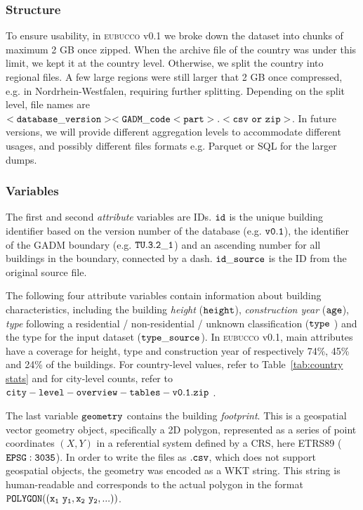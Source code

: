 \documentclass[fleqn,10pt]{wlscirep}
\begin{document}
\subsubsection*{Structure}
To ensure usability, in \textsc{eubucco} v0.1 we broke down the dataset into chunks of maximum 2 GB once zipped. When the archive file of the country was under this limit, we kept it at the country level. Otherwise, we split the country into regional files. A few large regions were still larger that 2 GB once compressed, e.g. in Nordrhein-Westfalen, requiring further splitting. Depending on the split level, file names are ${\tt <database\_version>\-<GADM\_code\-<part>.<csv\ or\ zip>}$. In future versions, we will provide different aggregation levels to accommodate different usages, and possibly different files formats e.g. Parquet or SQL for the larger dumps.

\subsubsection*{Variables}
The first and second \textit{attribute} variables are IDs.  ${\tt id}$ is the unique building identifier based on the version number of the database (e.g. ${\tt  v0.1}$), the identifier of the GADM boundary (e.g. ${\tt TU.3.2\_1}$) and an ascending number for all buildings in the boundary, connected by a dash. 
${\tt id\_source}$ is the ID from the original source file.
 
The following four attribute variables contain information about building characteristics, including the building \textit{height} (${\tt height}$), \textit{construction year} ($\tt{age}$), \textit{type} following a residential / non-residential / unknown classification (${\tt type}$ ) and the type for the input dataset (${\tt type\_source}$). In \textsc{eubucco} v0.1, main attributes have a coverage for height, type and construction year of respectively 74\%, 45\% and 24\% of the buildings. For country-level values, refer to  Table~\ref{tab:country stats}  and for city-level counts, refer to ${\tt city-level-overview-tables-v0.1.zip}$ .  

The last variable $\tt{geometry}$ contains the building \textit{footprint}. This is a geospatial vector geometry object, specifically a 2D polygon, represented as a series of point coordinates $(X,Y)$ in a referential system defined by a CRS, here ETRS89 ($\tt{EPSG:3035}$). In order to write the files as $\tt{.csv}$, which does not support geospatial objects, the geometry was encoded as a WKT string. This string is human-readable and corresponds to the actual polygon in the format $\tt{POLYGON ((x_1 \ y_1, x_2 \ y_2,...))}$. 
\end{document}
